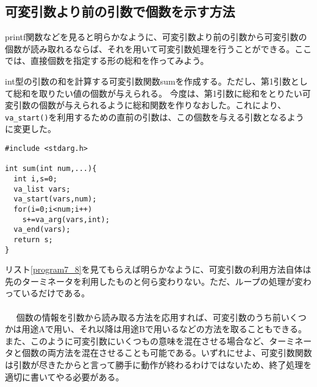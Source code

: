 \subsection{可変引数より前の引数で個数を示す方法}
printf関数などを見ると明らかなように、可変引数より前の引数から可変引数の個数が読み取れるならば、それを用いて可変引数処理を行うことができる。ここでは、直接個数を指定する形の総和を作ってみよう。
\begin{boxnote}
\begin{multicols}{2}
int型の引数の和を計算する可変引数関数sumを作成する。ただし、第1引数として総和を取りたい値の個数が与えられる。
今度は、第1引数に総和をとりたい可変引数の個数が与えられるように総和関数を作りなおした。これにより、\verb|va_start()|を利用するための直前の引数は、この個数を与える引数となるように変更した。
\begin{lstlisting}[caption=個数情報利用による総和計算関数,label=program7_8]
#include <stdarg.h> 

int sum(int num,...){
  int i,s=0; 
  va_list vars; 
  va_start(vars,num); 
  for(i=0;i<num;i++)
    s+=va_arg(vars,int); 
  va_end(vars); 
  return s; 
}
\end{lstlisting}
\end{multicols}
\end{boxnote}

リスト\ref{program7_8}を見てもらえば明らかなように、可変引数の利用方法自体は先のターミネータを利用したものと何ら変わりない。ただ、ループの処理が変わっているだけである。
\\ \\　
個数の情報を引数から読み取る方法を応用すれば、可変引数のうち前いくつかは用途Aで用い、それ以降は用途Bで用いるなどの方法を取ることもできる。また、このように可変引数にいくつもの意味を混在させる場合など、ターミネータと個数の両方法を混在させることも可能である。いずれにせよ、可変引数関数は引数が尽きたからと言って勝手に動作が終わるわけではないため、終了処理を適切に書いてやる必要がある。

